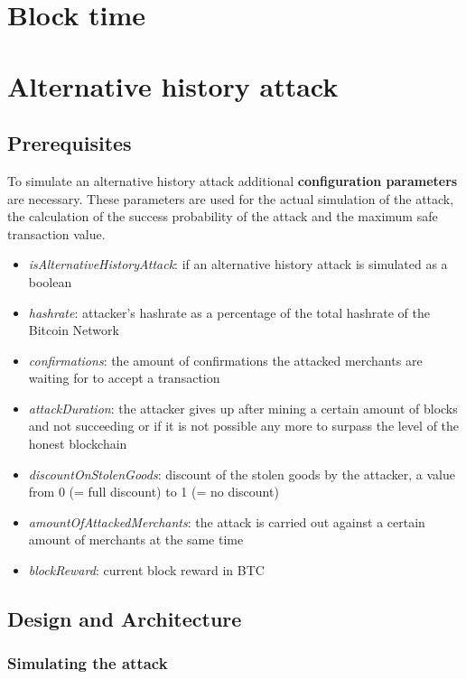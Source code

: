 \section{Block time}

\section{Alternative history attack}

\subsection{Prerequisites}

To simulate an alternative history attack additional \textbf{configuration parameters} are necessary. These parameters are used for the actual simulation of the attack, the calculation of the success probability of the attack and the maximum safe transaction value.

\begin{itemize}
\item \textit{isAlternativeHistoryAttack}: if an alternative history attack is simulated as a boolean
\item \textit{hashrate}: attacker's hashrate as a percentage of the total hashrate of the Bitcoin Network
\item \textit{confirmations}: the amount of confirmations the attacked merchants are waiting for to accept a transaction
\item \textit{attackDuration}: the attacker gives up after mining a certain amount of blocks and not succeeding or if it is not possible any more to surpass the level of the honest blockchain
\item \textit{discountOnStolenGoods}: discount of the stolen goods by the attacker, a value from 0 (= full discount) to 1 (= no discount)
\item \textit{amountOfAttackedMerchants}: the attack is carried out against a certain amount of merchants at the same time
\item \textit{blockReward}: current block reward in BTC
\end{itemize}

\subsection{Design and Architecture}

\subsubsection{Simulating the attack}

